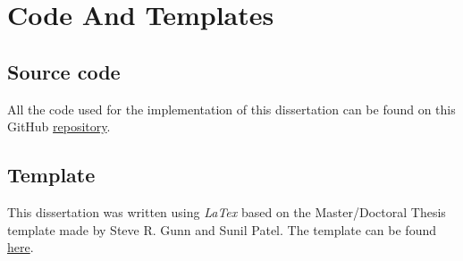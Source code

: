 
\chapter{Code And Templates} %

\label{AppendixA} %

\section{Source code}

All the code used for the implementation of this dissertation can be found on this GitHub \href{https://github.com/hperezblasco/mbit-tfm}{repository}.

\section{Template}

This dissertation was written using \textit{LaTex} based on the Master/Doctoral Thesis template made by Steve R. Gunn and Sunil Patel. The template can be found \href{https://www.latextemplates.com/template/masters-doctoral-thesis}{here}.
